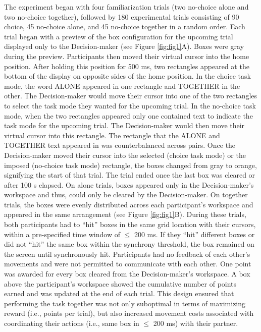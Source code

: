 \documentclass[
  man,
  floatsintext,
  longtable,
  nolmodern,
  notxfonts,
  notimes,
  mask,
  colorlinks=true,linkcolor=blue,citecolor=blue,urlcolor=blue]{apa7}
\begin{document}
The experiment began with four familiarization trials (two no-choice
alone and two no-choice together), followed by 180 experimental trials
consisting of 90 choice, 45 no-choice alone, and 45 no-choice together
in a random order. Each trial began with a preview of the box
configuration for the upcoming trial displayed only to the
Decision-maker (see Figure \ref{fig:fig1}A). Boxes were gray during the
preview. Participants then moved their virtual cursor into the home
position. After holding this position for 500 ms, two rectangles
appeared at the bottom of the display on opposite sides of the home
position. In the choice task mode, the word ALONE appeared in one
rectangle and TOGETHER in the other. The Decision-maker would move their
cursor into one of the two rectangles to select the task mode they
wanted for the upcoming trial. In the no-choice task mode, when the two
rectangles appeared only one contained text to indicate the task mode
for the upcoming trial. The Decision-maker would then move their virtual
cursor into this rectangle. The rectangle that the ALONE and TOGETHER
text appeared in was counterbalanced across pairs. Once the
Decision-maker moved their cursor into the selected (choice task mode)
or the imposed (no-choice task mode) rectangle, the boxes changed from
gray to orange, signifying the start of that trial. The trial ended once
the last box was cleared or after 100 s elapsed. On alone trials, boxes
appeared only in the Decision-maker's workspace and thus, could only be
cleared by the Decision-maker. On together trials, the boxes were evenly
distributed across each participant's workspace and appeared in the same
arrangement (see Figure \ref{fig:fig1}B). During these trials, both
participants had to ``hit'' boxes in the same grid location with their
cursors, within a pre-specified time window of \(\leq\) 200 ms. If they
``hit'' different boxes or did not ``hit'' the same box within the
synchrony threshold, the box remained on the screen until synchronously
hit. Participants had no feedback of each other's movements and were not
permitted to communicate with each other. One point was awarded for
every box cleared from the Decision-maker's workspace. A box above the
participant's workspace showed the cumulative number of points earned
and was updated at the end of each trial. This design ensured that
performing the task together was not only suboptimal in terms of
maximizing reward (i.e., points per trial), but also increased movement
costs associated with coordinating their actions (i.e., same box in
\(\leq\) 200 ms) with their partner.
\end{document}
